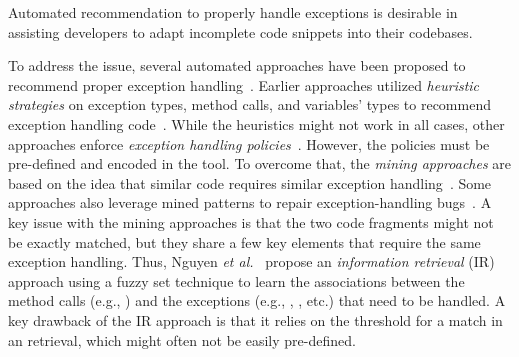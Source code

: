 \begin{Observation} 
Automated recommendation to properly handle exceptions is desirable in
assisting developers to adapt incomplete code snippets into their codebases.
\end{Observation}


To address the issue, several automated approaches have been proposed
to recommend proper exception
handling~\cite{xrank-fse20,barbosa-bsse12,chanchal-scam14,barbosa-tse18,barbosa-tse16}. Earlier
approaches utilized {\em heuristic strategies} on exception types,
method calls, and variables' types to recommend exception handling
code~\cite{barbosa-bsse12}. While the heuristics might not work in all
cases, other approaches enforce {\em exception handling
  policies}~\cite{barbosa-tse16,barbosa-saner18}. However, the
policies must be pre-defined and encoded in the tool. To overcome
that, the {\em mining approaches} are based on the idea that similar
code requires similar exception handling~\cite{chanchal-scam14}. Some
approaches also leverage mined patterns to repair exception-handling
bugs~\cite{zhong-jss18}. A key issue with the mining approaches is
that the two code fragments might not be exactly matched, but they
share a few key elements that require the same exception handling.
Thus, Nguyen {\em et al.}~\cite{xrank-fse20} propose an {\em
  information retrieval} (IR) approach using a fuzzy set technique to
learn the associations between the method calls (e.g.,
) and the exceptions (e.g.,
, , etc.)
that need to be handled. A key drawback of the IR approach is that it
relies on the threshold for a match in an retrieval, which might often
not be easily pre-defined.





